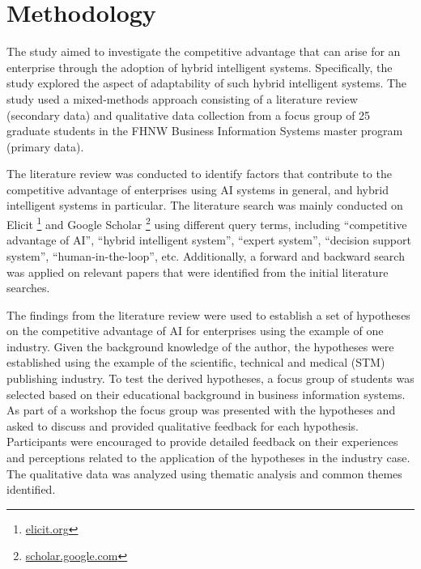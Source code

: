 \section{Methodology}
\label{sec:methods}

The study aimed to investigate the competitive advantage that can arise for an enterprise
through the adoption of hybrid intelligent systems. Specifically, the study explored the aspect of adaptability
of such hybrid intelligent systems. The study used a mixed-methods approach consisting of a literature
review (secondary data) and qualitative data collection from a focus group of 25 graduate students in the
FHNW Business Information Systems master program (primary data).

The literature review was conducted to identify factors that contribute to the competitive advantage
of enterprises using AI systems in general, and hybrid intelligent systems in particular. The
literature search was mainly conducted on Elicit \footnote{\href{https://elicit.org/}{elicit.org}}
and Google Scholar \footnote{\href{https://scholar.google.com/}{scholar.google.com}} using different
query terms, including ``competitive advantage of AI'', ``hybrid intelligent system'',
``expert system'', ``decision support system'', ``human-in-the-loop'', etc. Additionally, a forward
and backward search was applied on relevant papers that were identified from the initial literature
searches.

The findings from the literature review were used to establish a set of hypotheses on the competitive
advantage of AI for enterprises using the example of one industry. Given the background knowledge of
the author, the hypotheses were established using the example of the scientific, technical and medical
(STM) publishing industry. To test the derived hypotheses, a focus group of students was selected based
on their educational background in business information systems. As part of a workshop the focus group
was presented with the hypotheses and asked to discuss and provided qualitative feedback for each hypothesis.
Participants were encouraged to provide detailed feedback on their experiences and perceptions related
to the application of the hypotheses in the industry case. The qualitative data was analyzed using
thematic analysis and common themes identified.